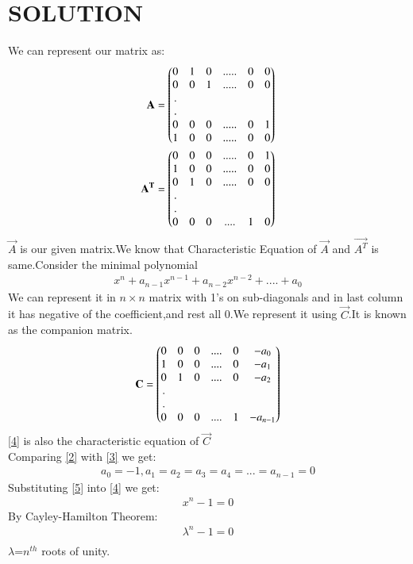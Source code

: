 \documentclass[journal,12pt,twocolumn]{IEEEtran}
\begin{document}
\section{SOLUTION}
We can represent our matrix as:
\begin{align}
    \mathbf{A}=\begin{pmatrix}0&1&0&.....&0&0\\0&0&1&.....&0&0\\.\\.\\0&0& 0&.....&0&1\\1&0&0&.....&0&0\end{pmatrix}\label{1}\\
    \mathbf{A^T}=\begin{pmatrix}0&0&0&.....&0&1\\1&0&0&.....&0&0\\0&1& 0&.....&0&0\\.\\.\\0&0&0&....&1&0\end{pmatrix}\label{2}
    \end{align}
$\vec{A}$ is our given matrix.We know that Characteristic Equation of $\vec{A}$ and $\vec{A^T}$ is same.Consider the minimal polynomial
\begin{align}
    x^n+a_{n-1}x^{n-1}+a_{n-2}x^{n-2}+....+a_0\label{4}
\end{align}
We can represent it in $n\times n$ matrix with 1's on sub-diagonals and in last column it has negative of the coefficient,and rest all 0.We represent it using $\vec{C}$.It is known as the companion matrix.
\begin{align}
     \mathbf{C}=\begin{pmatrix}0&0&0&....&0&-a_0\\1&0&0&....&0&-a_1\\0&1& 0&....&0&-a_2\\.\\.\\0&0&0&....&1&-a_{n-1}\end{pmatrix}\label{3}
\end{align}
\eqref{4} is also the characteristic equation of $\vec{C}$\\
Comparing \eqref{2} with \eqref{3} we get:
\begin{align}
    a_0=-1, a_1=a_2=a_3=a_4=...=a_{n-1}=0\label{5}
\end{align}
Substituting \eqref{5} into \eqref{4} we get:
\begin{align}
    x^n-1=0\label{6}
\end{align}
By Cayley-Hamilton Theorem:
\begin{align}
    \lambda^n-1=0\\
\end{align}
 $\lambda$=$n^{th}$ roots of unity.\\
\end{document}
